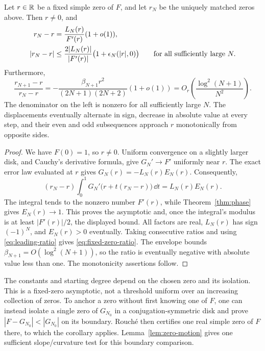 \begin{corollary}
\label{cor:fixed-zero-drift}
Let \(r\in\mathbb R\) be a fixed simple zero of \(F\), and let \(r_N\)
be the uniquely matched zeros above. Then \(r\ne0\), and
\begin{equation}
 \begin{aligned}
 r_N-r&=\frac{L_N(r)}{F'(r)}(1+o(1)),\\
 |r_N-r|&\le
 \frac{2|L_N(r)|}{|F'(r)|}
       \bigl(1+\epsilon_N(|r|,0)\bigr)
       \qquad\hbox{for all sufficiently large }N.
 \end{aligned}
 \label{eq:fixed-zero-displacement}
\end{equation}
Furthermore,
\begin{equation}
 \frac{r_{N+1}-r}{r_N-r}
 =-\frac{\beta_{N+1}r^2}{(2N+1)(2N+2)}(1+o(1))
 =O_r\!\left(\frac{\log^2(N+1)}{N^2}\right).
 \label{eq:fixed-zero-ratio}
\end{equation}
The denominator on the left is nonzero for all sufficiently large
\(N\). The displacements eventually alternate in sign, decrease
in absolute value at every step, and their even and odd subsequences
approach \(r\) monotonically from opposite sides.
\end{corollary}

\begin{proof}
We have \(F(0)=1\), so \(r\ne0\). Uniform convergence on a slightly
larger disk, and Cauchy's derivative formula, give \(G_N'\to F'\)
uniformly near \(r\). The exact error law evaluated at \(r\) gives
\(G_N(r)=-L_N(r)E_N(r)\). Consequently,
\[
 (r_N-r)\int_0^1G_N'\bigl(r+t(r_N-r)\bigr)\,\dd t
       =L_N(r)E_N(r).
\]
The integral tends to the nonzero number \(F'(r)\), while
Theorem~\ref{thm:phase} gives \(E_N(r)\to1\).
This proves the asymptotic and, once the integral's modulus is at
least \(|F'(r)|/2\), the displayed bound.
All factors are real, \(L_N(r)\) has sign \((-1)^N\), and
\(E_N(r)>0\) eventually. Taking consecutive ratios and using
\eqref{eq:leading-ratio} gives \eqref{eq:fixed-zero-ratio}.
The envelope bounds \(\beta_{N+1}=O(\log^2(N+1))\), so the
ratio is eventually negative with absolute value less than one.
The monotonicity assertions follow.
\end{proof}

The constants and starting degree depend on the chosen zero and
its isolation. This is a fixed-zero asymptotic, not a threshold
uniform over an increasing collection of zeros. To anchor a zero
without first knowing one of \(F\), one can instead isolate a single
zero of \(G_{N_0}\) in a conjugation-symmetric disk and prove
\(|F-G_{N_0}|<|G_{N_0}|\) on its boundary. Rouch\'e then certifies
one real simple zero of \(F\) there, to which the corollary applies.
Lemma~\ref{lem:zero-motion} gives one sufficient slope/curvature
test for this boundary comparison.

